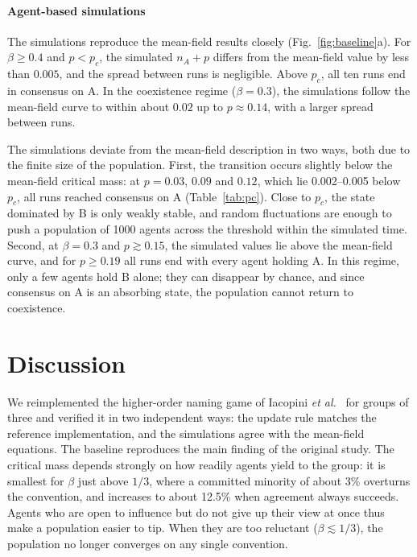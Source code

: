\documentclass[9pt,twoside]{pnas-new}
\begin{document}
\paragraph*{Agent-based simulations}
The simulations reproduce the mean-field results closely
(Fig.~\ref{fig:baseline}a). For $\beta\ge0.4$ and $p<p_c$, the simulated
$n_A+p$ differs from the mean-field value by less than $0.005$, and the spread
between runs is negligible. Above $p_c$, all ten runs end in consensus on A.
In the coexistence regime ($\beta=0.3$), the simulations follow the mean-field
curve to within about $0.02$ up to $p\approx0.14$, with a larger spread between
runs.

The simulations deviate from the mean-field description in two ways, both due
to the finite size of the population. First, the transition occurs slightly
below the mean-field critical mass: at $p=0.03$, $0.09$ and $0.12$, which lie
0.002--0.005 below $p_c$, all runs reached consensus on A
(Table~\ref{tab:pc}). Close to $p_c$, the state dominated by B is only weakly
stable, and random fluctuations are enough to push a population of 1000 agents
across the threshold within the simulated time. Second, at $\beta=0.3$ and
$p\gtrsim0.15$, the simulated values lie above the mean-field curve, and for
$p\ge0.19$ all runs end with every agent holding A. In this regime, only a few
agents hold B alone; they can disappear by chance, and since consensus on A is
an absorbing state, the population cannot return to coexistence.

\section{Discussion}

We reimplemented the higher-order naming game of Iacopini
\emph{et al.}~\cite{iacopini2022group} for groups of three and verified it in
two independent ways: the update rule matches the reference implementation,
and the simulations agree with the mean-field equations. The baseline
reproduces the main finding of the original study. The critical mass depends
strongly on how readily agents yield to the group: it is smallest for $\beta$
just above $1/3$, where a committed minority of about 3\% overturns the
convention, and increases to about 12.5\% when agreement always succeeds.
Agents who are open to influence but do not give up their view at once thus
make a population easier to tip. When they are too reluctant
($\beta\lesssim1/3$), the population no longer converges on any single
convention.
\end{document}
